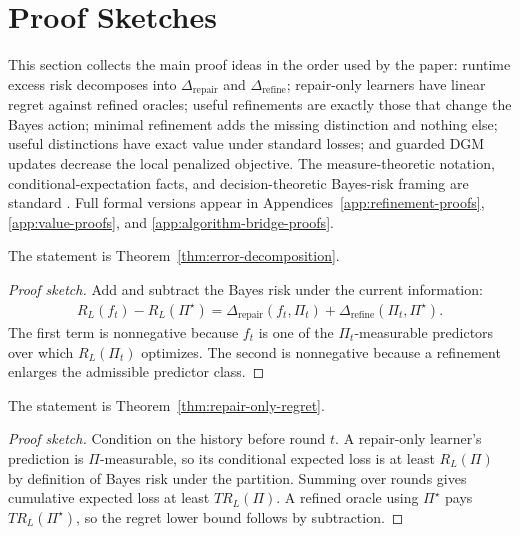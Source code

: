 \section{Proof Sketches}
\label{sec:technical-overview}

This section collects the main proof ideas in the order used by the paper: runtime excess risk decomposes into $\Delta_{\mathrm{repair}}$ and $\Delta_{\mathrm{refine}}$; repair-only learners have linear regret against refined oracles; useful refinements are exactly those that change the Bayes action; minimal refinement adds the missing distinction and nothing else; useful distinctions have exact value under standard losses; and guarded DGM updates decrease the local penalized objective. The measure-theoretic notation, conditional-expectation facts, and decision-theoretic Bayes-risk framing are standard \citep{billingsley1995probability,kallenberg2002foundations,blackwell1953equivalent,berger1985statistical}. Full formal versions appear in Appendices~\ref{app:refinement-proofs}, \ref{app:value-proofs}, and \ref{app:algorithm-bridge-proofs}.

\begin{theorem}
\label{thm:error-decomposition:sketch}
The statement is Theorem~\ref{thm:error-decomposition}.
\end{theorem}
\begin{proof}[Proof sketch]
Add and subtract the Bayes risk under the current information:
\begin{align*}
R_L(f_t)-R_L(\Pi^\star)
=
\Delta_{\mathrm{repair}}(f_t,\Pi_t)
+
\Delta_{\mathrm{refine}}(\Pi_t,\Pi^\star).
\end{align*}
The first term is nonnegative because $f_t$ is one of the $\Pi_t$-measurable predictors over which $R_L(\Pi_t)$ optimizes. The second is nonnegative because a refinement enlarges the admissible predictor class.
\end{proof}

\begin{theorem}
\label{thm:repair-only-regret:sketch}
The statement is Theorem~\ref{thm:repair-only-regret}.
\end{theorem}
\begin{proof}[Proof sketch]
Condition on the history before round $t$. A repair-only learner's prediction is $\Pi$-measurable, so its conditional expected loss is at least $R_L(\Pi)$ by definition of Bayes risk under the partition. Summing over rounds gives cumulative expected loss at least $TR_L(\Pi)$. A refined oracle using $\Pi^\star$ pays $TR_L(\Pi^\star)$, so the regret lower bound follows by subtraction.
\end{proof}

